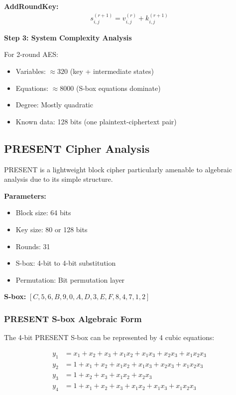 \documentclass[12pt,a4paper]{article}
\begin{document}
\textbf{AddRoundKey:}
\begin{align}
s_{i,j}^{(r+1)} = v_{i,j}^{(r)} + k_{i,j}^{(r+1)}
\end{align}

\textbf{Step 3: System Complexity Analysis}

For 2-round AES:
\begin{itemize}
    \item Variables: $\approx 320$ (key + intermediate states)
    \item Equations: $\approx 8000$ (S-box equations dominate)
    \item Degree: Mostly quadratic
    \item Known data: 128 bits (one plaintext-ciphertext pair)
\end{itemize}

\subsection{PRESENT Cipher Analysis}

PRESENT is a lightweight block cipher particularly amenable to algebraic analysis due to its simple structure.

\begin{examplebox}[title=PRESENT Cipher Specification]
\textbf{Parameters:}
\begin{itemize}
    \item Block size: 64 bits
    \item Key size: 80 or 128 bits
    \item Rounds: 31
    \item S-box: 4-bit to 4-bit substitution
    \item Permutation: Bit permutation layer
\end{itemize}

\textbf{S-box:} $[C, 5, 6, B, 9, 0, A, D, 3, E, F, 8, 4, 7, 1, 2]$
\end{examplebox}

\subsubsection{PRESENT S-box Algebraic Form}

The 4-bit PRESENT S-box can be represented by 4 cubic equations:

\begin{align}
y_1 &= x_1 + x_2 + x_3 + x_1x_2 + x_1x_3 + x_2x_3 + x_1x_2x_3 \\
y_2 &= 1 + x_1 + x_2 + x_1x_2 + x_1x_3 + x_2x_3 + x_1x_2x_3 \\
y_3 &= 1 + x_2 + x_3 + x_1x_2 + x_2x_3 \\
y_4 &= 1 + x_1 + x_2 + x_3 + x_1x_2 + x_1x_3 + x_1x_2x_3
\end{align}
\end{document}
